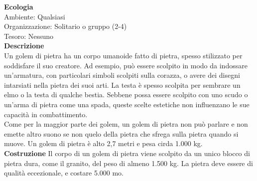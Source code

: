 \begin{multicols}{2}
\textbf{Ecologia}\\
Ambiente: Qualsiasi\\
Organizzazione: Solitario o gruppo (2-4)\\
Tesoro: Nessuno\\
\textbf{Descrizione}\\
Un golem di pietra ha un corpo umanoide fatto di pietra, spesso stilizzato per soddisfare il suo creatore. Ad esempio, può essere scolpito in modo da indossare un’armatura, con particolari simboli scolpiti sulla corazza, o avere dei disegni intarsiati nella pietra dei suoi arti. La testa è spesso scolpita per sembrare un elmo o la testa di qualche bestia. Sebbene possa essere scolpito con uno scudo o un’arma di pietra come una spada, queste scelte estetiche non influenzano le sue capacità in combattimento.\\

Come per la maggior parte dei golem, un golem di pietra non può parlare e non emette altro suono se non quelo della pietra che sfrega sulla pietra quando si muove. Un golem di pietra è alto 2,7 metri e pesa cirda 1.000 kg.\\

\textbf{Costruzione}
Il corpo di un golem di pietra viene scolpito da un unico blocco di pietra dura, come il granito, del peso di almeno 1.500 kg. La pietra deve essere di qualità eccezionale, e costare 5.000 mo.\\


\end{multicols}
